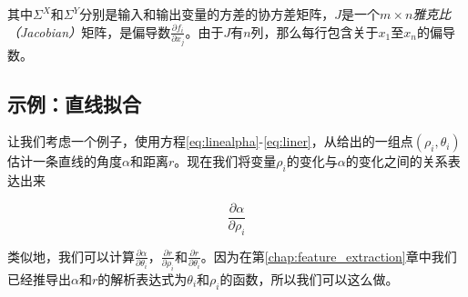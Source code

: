 其中$\Sigma^X$和$\Sigma^Y$分别是输入和输出变量的方差的协方差矩阵，$J$是一个$m\times n$\emph{雅克比（Jacobian）}矩阵，是偏导数$\frac{\partial f_i}{\partial x_j}$。由于$J$有$n$列，那么每行包含关于$x_1$至$x_n$的偏导数。

\subsection{示例：直线拟合}
\label{sec:linefitting}


让我们考虑一个例子，使用方程\ref{eq:linealpha}-\ref{eq:liner}，从给出的一组点$(\rho_i,\theta_i)$估计一条直线的角度$\alpha$和距离$r$。现在我们将变量$\rho_i$的变化与$\alpha$的变化之间的关系表达出来

\begin{equation}
\frac{\partial \alpha}{\partial \rho_i}
\end{equation}


类似地，我们可以计算$\frac{\partial\alpha}{\partial\theta_i}$，$\frac{\partial r}{\partial\rho_i}$和$\frac{\partial r}{\partial\theta_i}$。因为在第\ref{chap:feature_extraction}章中我们已经推导出$\alpha$和$r$的解析表达式为$\theta_i$和$\rho_i$的函数，所以我们可以这么做。


